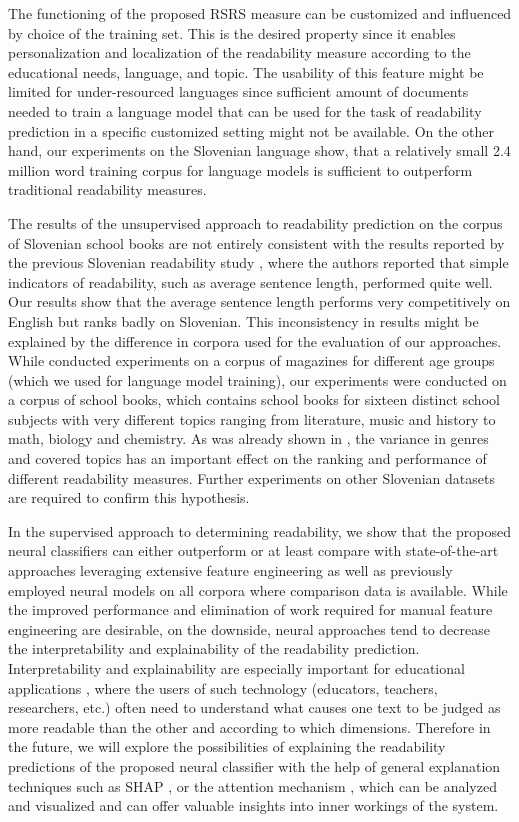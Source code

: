 \documentclass{clv3}
\begin{document}
The functioning of the proposed RSRS measure can be customized and influenced by choice of the training set. This is the desired property since it enables personalization and localization of the readability measure according to the educational needs, language, and topic. The usability of this feature might be limited for under-resourced languages since sufficient amount of documents needed to train a language model that can be used for the task of readability prediction in a specific customized setting might not be available. On the other hand, our experiments on the Slovenian language show, that a relatively small 2.4 million word training corpus for language models is sufficient to outperform traditional readability measures.

The results of the unsupervised approach to readability prediction on the corpus of Slovenian school books are not entirely consistent with the results reported by the previous Slovenian readability study \citep{vskvorcevaluation}, where the authors reported that simple indicators of readability, such as average sentence length, performed quite well. Our results show that the average sentence length performs very competitively on English but ranks badly on Slovenian. This inconsistency in results might be explained by the difference in corpora used for the evaluation of our approaches. While \citet{vskvorcevaluation} conducted experiments on a corpus of magazines for different age groups (which we used for language model training), our experiments were conducted on a corpus of school books, which contains school books for sixteen distinct school subjects with very different topics ranging from literature, music and history to math, biology and chemistry. As was already shown in \citet{sheehan2013two}, the variance in genres and covered topics has an important effect on the ranking and performance of different readability measures. Further experiments on other Slovenian datasets are required to confirm this hypothesis.  

In the supervised approach to determining readability, we show that the proposed neural classifiers can either outperform or at least compare with state-of-the-art approaches leveraging extensive feature engineering as well as previously employed neural models on all corpora where comparison data is available. While the improved performance and elimination of work required for manual feature engineering are desirable, on the downside, neural approaches tend to decrease the interpretability and explainability of the readability prediction. Interpretability and explainability are especially important for educational applications \citep{madnani2018automated,sheehan2014textevaluator}, where the users of such technology (educators, teachers, researchers, etc.) often need to understand what causes one text to be judged as more readable than the other and according to which dimensions. Therefore in the future, we will explore the possibilities of explaining the readability predictions of the proposed neural classifier with the help of general explanation techniques such as SHAP \citep{Lundberg2017}, or the attention mechanism \citep{vaswani2017attention}, which can be analyzed and visualized and can offer valuable insights into inner workings of the system.
\end{document}
